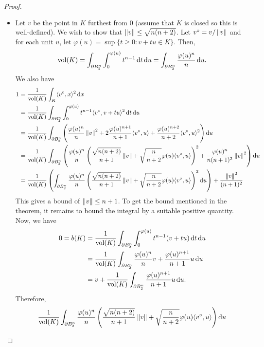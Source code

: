 \documentclass{article}
\begin{document}
\begin{proof}
\begin{itemize}
				\item Let $v$ be the point in $K$ furthest from $0$ (assume that $K$ is closed so this is well-defined). We wish to show that $\left\lVert v\right\rVert\leq\sqrt{n(n+2)}$. Let $v^{\circ} = v/\left\lVert v\right\rVert$ and for each unit $u$, let $\varphi(u) = \sup\{t\geq 0 : v+tu\in K\}$. Then,
				\[ \operatorname{vol}(K) = \int_{\partial B_2^n} \int_{0}^{\varphi(u)} t^{n-1}\operatorname{d}\!{t}\operatorname{d}\!{u} = \int_{\partial B_2^n} \frac{\varphi(u)^n}{n} \operatorname{d}\!{u}. \]
				We also have
				\begin{align*}
					1 &= \frac{1}{\operatorname{vol}(K)} \int_K \langle v^\circ, x\rangle^2 \operatorname{d}\!{x} \\
					 &=  \frac{1}{\operatorname{vol}(K)} \int_{\partial B_2^n} \int_0^{\varphi(u)} t^{n-1} \langle v^\circ, v+tu\rangle^2 \operatorname{d}\!{t}\operatorname{d}\!{u} \\
					 &= \frac{1}{\operatorname{vol}(K)} \int_{\partial B_2^n} \left( \frac{\varphi(u)^n}{n}\left\lVert v\right\rVert^2 + 2\frac{\varphi(u)^{n+1}}{n+1} \langle v^\circ, u\rangle + \frac{\varphi(u)^{n+2}}{n+2} \langle v^\circ, u\rangle^2 \right) \operatorname{d}\!{u} \\
					 &= \frac{1}{\operatorname{vol}(K)} \int_{\partial B_2^n} \left( \frac{\varphi(u)^n}{n} \left(\frac{\sqrt{n(n+2)}}{n+1}\left\lVert v\right\rVert + \sqrt{\frac{n}{n+2}}\varphi(u) \langle v^\circ, u\rangle\right)^2 + \frac{\varphi(u)^n}{n(n+1)^2}\left\lVert v\right\rVert^2 \right) \operatorname{d}\!{u} \\
					 &= \frac{1}{\operatorname{vol}(K)} \left( \int_{\partial B_2^n} \frac{\varphi(u)^n}{n} \left(\frac{\sqrt{n(n+2)}}{n+1}\left\lVert v\right\rVert + \sqrt{\frac{n}{n+2}}\varphi(u)\langle v^\circ, u\rangle\right)^2 \operatorname{d}\!{u} \right) + \frac{\left\lVert v\right\rVert^2}{(n+1)^2}
				\end{align*}
				This gives a bound of $\left\lVert v\right\rVert\leq n+1$. To get the bound mentioned in the theorem, it remains to bound the integral by a suitable positive quantity. Now, we have
				\begin{align*}
					0 = b(K) &= \frac{1}{\operatorname{vol}(K)} \int_{\partial B_2^n} \int_{0}^{\varphi(u)} t^{n-1} (v+tu) \operatorname{d}\!{t}\operatorname{d}\!{u} \\
					 &= \frac{1}{\operatorname{vol}(K)} \int_{\partial B_2^n} \frac{\varphi(u)^n}{n}v + \frac{\varphi(u)^{n+1}}{n+1}u \operatorname{d}\!{u} \\
					 &= v + \frac{1}{\operatorname{vol}(K)} \int_{\partial B_2^n} \frac{\varphi(u)^{n+1}}{n+1}u\operatorname{d}\!{u}.
				\end{align*}
				Therefore,
				\begin{multline*}
					\frac{1}{\vol(K)} \int_{\partial B_2^n} \frac{\varphi(u)^n}{n} \left(\frac{\sqrt{n(n+2)}}{n+1}\norm{v} + \sqrt{\frac{n}{n+2}}\varphi(u) \langle v^\circ,u\rangle\right) \d{u} \\

\end{multline*}
\end{itemize}
\end{proof}
\end{document}
